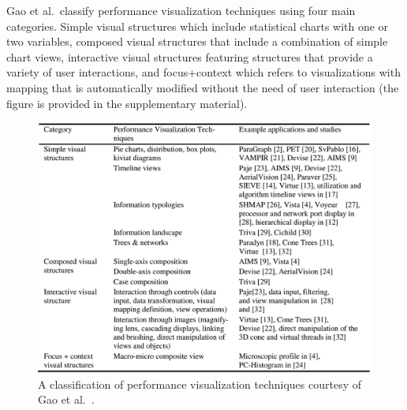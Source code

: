 Gao et al.\ classify performance visualization techniques using four main categories. Simple visual structures which include statistical charts with one or two variables, composed visual structures that include a combination of simple chart views, interactive visual structures featuring structures that provide a variety of user interactions, and focus+context which refers to visualizations with mapping that is automatically modified without the need of user interaction (the figure is provided in the supplementary material).


\begin{figure}[t]
\begin{center}
\includegraphics[width=1\textwidth]{images/gao2011performance}
\caption{A classification of performance visualization techniques courtesy of Gao et al.\ \cite{gao2011performance}.} \label{fig: gao2011performance}
\end{center}
\end{figure}

%
%

